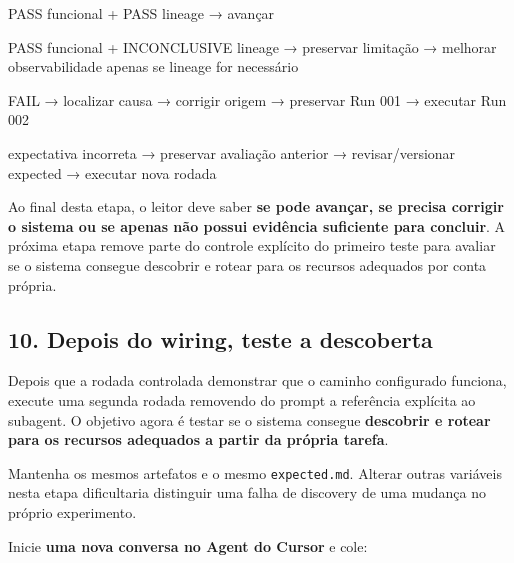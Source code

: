\documentclass[
  10pt,
  a4paper,
  oneside]{book}
\newenvironment{Shaded}{}{}
\newcommand{\NormalTok}[1]{#1}
\renewenvironment{Shaded}{\begin{snugshade}}{\end{snugshade}}%
\begin{document}
\begin{Shaded}
\begin{Highlighting}[]
\NormalTok{PASS funcional + PASS lineage}
\NormalTok{→ avançar}

\NormalTok{PASS funcional + INCONCLUSIVE lineage}
\NormalTok{→ preservar limitação}
\NormalTok{→ melhorar observabilidade apenas se lineage for necessário}

\NormalTok{FAIL}
\NormalTok{→ localizar causa}
\NormalTok{→ corrigir origem}
\NormalTok{→ preservar Run 001}
\NormalTok{→ executar Run 002}

\NormalTok{expectativa incorreta}
\NormalTok{→ preservar avaliação anterior}
\NormalTok{→ revisar/versionar expected}
\NormalTok{→ executar nova rodada}
\end{Highlighting}
\end{Shaded}

Ao final desta etapa, o leitor deve saber \textbf{se pode avançar, se
precisa corrigir o sistema ou se apenas não possui evidência suficiente
para concluir}. A próxima etapa remove parte do controle explícito do
primeiro teste para avaliar se o sistema consegue descobrir e rotear
para os recursos adequados por conta própria.

\hypertarget{depois-do-wiring-teste-a-descoberta}{%
\subsection{10. Depois do wiring, teste a
descoberta}\label{depois-do-wiring-teste-a-descoberta}}

Depois que a rodada controlada demonstrar que o caminho configurado
funciona, execute uma segunda rodada removendo do prompt a referência
explícita ao subagent. O objetivo agora é testar se o sistema consegue
\textbf{descobrir e rotear para os recursos adequados a partir da
própria tarefa}.

Mantenha os mesmos artefatos e o mesmo \texttt{expected.md}. Alterar
outras variáveis nesta etapa dificultaria distinguir uma falha de
discovery de uma mudança no próprio experimento.

Inicie \textbf{uma nova conversa no Agent do Cursor} e cole:
\end{document}
